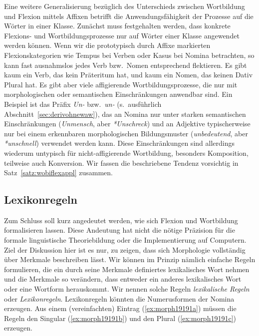 Eine weitere Generalisierung bezüglich des Unterschieds zwischen Wortbildung und Flexion mittels Affixen betrifft die Anwendungsfähigkeit der Prozesse auf die Wörter in einer Klasse.
Zunächst muss festgehalten werden, dass konkrete Flexions- und Wortbildungsprozesse nur auf Wörter einer Klasse angewendet werden können.
Wenn wir die prototypisch durch Affixe markierten Flexionskategorien wie Tempus bei Verben oder Kasus bei Nomina betrachten, so kann fast ausnahmslos jedes Verb bzw.\ Nomen entsprechend flektieren.
Es gibt \zB kaum ein Verb, das kein Präteritum hat, und kaum ein Nomen, das keinen Dativ Plural hat.
Es gibt aber viele affigierende Wortbildungsprozesse, die nur mit morphologischen oder semantischen Einschränkungen anwendbar sind.
Ein Beispiel ist das Präfix \textit{Un-} bzw.\ \textit{un-} (s.\ ausführlich Abschnitt~\ref{sec:derivohnewaw}), das an Nomina nur unter starken semantischen Einschränkungen (\textit{Unmensch}, aber \textit{*Unschreck}) und an Adjektive typischerweise nur bei einem erkennbaren morphologischen Bildungsmuster (\textit{unbedeutend}, aber \textit{*unschnell}) verwendet werden kann.
Diese Einschränkungen sind allerdings wiederum untypisch für nicht-affigierende Wortbildung, besonders Komposition, teilweise auch Konversion.
Wir fassen die beschriebene Tendenz vorsichtig in Satz~\ref{satz:wobiflexappl} zusammen.


\subsection{Lexikonregeln}

\label{sec:lexikonregel}

Zum Schluss soll kurz angedeutet werden, wie sich Flexion und Wortbildung formalisieren lassen.
Diese Andeutung hat nicht die nötige Präzision für die formale linguistische Theoriebildung oder die Implementierung auf Computern.
Ziel der Diskussion hier ist es nur, zu zeigen, dass sich Morphologie vollständig über Merkmale beschreiben lässt.
Wir können im Prinzip nämlich einfache Regeln formulieren, die ein durch seine Merkmale definiertes lexikalisches Wort nehmen und die Merkmale so verändern, dass entweder ein anderes lexikalisches Wort oder eine Wortform herauskommt.
Wir nennen solche Regeln \textit{lexikalische Regeln} oder \textit{Lexikonregeln}.
Lexikonregeln könnten \zB die Numerusformen der Nomina erzeugen.
Aus einem (vereinfachten) Eintrag (\ref{ex:morph19191a}) müssen die Regeln den Singular (\ref{ex:morph19191b}) und den Plural (\ref{ex:morph19191c}) erzeugen.

